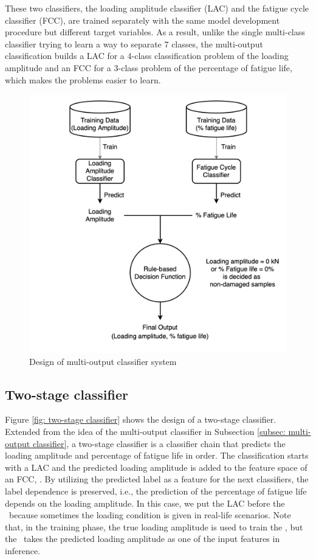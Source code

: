 These two classifiers, the loading amplitude classifier (LAC) and the fatigue cycle classifier (FCC), are trained separately with the same model development procedure but different target variables. As a result, unlike the single multi-class classifier trying to learn a way to separate 7 classes, the multi-output classification builds a LAC for a 4-class classification problem of the loading amplitude and an FCC for a 3-class problem of the percentage of fatigue life, which makes the problems easier to learn.

\begin{figure}[tb]
    \centering
    \includegraphics[width=0.9\linewidth]{fig/multi-ouput_classifier.png}
    \caption{Design of multi-output classifier system}
    \label{fig: multi-output classifier}
\end{figure}

\subsection{Two-stage classifier}
Figure \ref{fig: two-stage classifier} shows the design of a two-stage classifier. Extended from the idea of the multi-output classifier in Subsection \ref{subsec: multi-output classifier}, a two-stage classifier is a classifier chain that predicts the loading amplitude and percentage of fatigue life in order. The classification starts with a LAC and the predicted loading amplitude is added to the feature space of an FCC, \fcctwo. By utilizing the predicted label as a feature for the next classifiers, the label dependence is preserved, i.e., the prediction of the percentage of fatigue life depends on the loading amplitude. In this case, we put the LAC before the \fcctwo \  because sometimes the loading condition is given in real-life scenarios. Note that, in the training phase, the true loading amplitude is used to train the \fcctwo, but the \fcctwo \ takes the predicted loading amplitude as one of the input features in inference.

